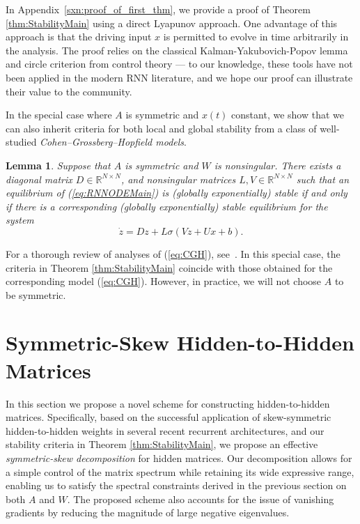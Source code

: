 \documentclass{article} \usepackage{iclr2021_conference,times}
\newtheorem{lemma}{Lemma}
\begin{document}
In Appendix~\ref{sxn:proof_of_first_thm}, we provide a proof of Theorem \ref{thm:StabilityMain} using a direct Lyapunov approach. One advantage of this approach is that the driving input $x$ is permitted to evolve in time arbitrarily in the analysis. The proof relies on the classical Kalman-Yakubovich-Popov lemma and circle criterion from control theory --- to our knowledge, these tools have not been applied in the modern RNN literature, and we hope our proof can illustrate their value to the community.

In the special case where $A$ is symmetric and $x(t)$ constant, we show that we can also inherit criteria for both local and global stability from a class of well-studied \emph{Cohen--Grossberg--Hopfield models}.
\begin{lemma}
\label{lem:CGH}
Suppose that $A$ is symmetric and $W$ is nonsingular. There exists a diagonal matrix $D \in \mathbb{R}^{N \times N}$, and nonsingular matrices $L,V \in \mathbb{R}^{N \times N}$ such that an equilibrium of (\ref{eq:RNNODEMain}) is (globally exponentially) stable if and only if there is a corresponding (globally exponentially) stable equilibrium for the system
\begin{equation}
\label{eq:CGH}
\dot{z} = Dz + L\sigma(V z + U x + b).
\end{equation}
\end{lemma}
For a thorough review of analyses of (\ref{eq:CGH}), see~\citep{zhang2014comprehensive}. In this special case, the criteria in Theorem \ref{thm:StabilityMain} coincide with those obtained for the corresponding model (\ref{eq:CGH}). However, in practice, we will not choose $A$ to be symmetric.


\section{Symmetric-Skew Hidden-to-Hidden Matrices}
\label{sec:hidden_scheme}

In this section we propose a novel scheme for constructing hidden-to-hidden matrices.
Specifically, based on the successful application of skew-symmetric hidden-to-hidden weights in several recent recurrent architectures, and our stability criteria in Theorem \ref{thm:StabilityMain}, we propose an effective \emph{symmetric-skew decomposition} for hidden matrices. Our decomposition allows for a simple control of the matrix spectrum while retaining its wide expressive range, enabling us to satisfy the spectral constraints derived in the previous section on both $A$ and $W$. The proposed scheme also accounts for the issue of vanishing gradients by reducing the magnitude of large negative eigenvalues.
\end{document}
